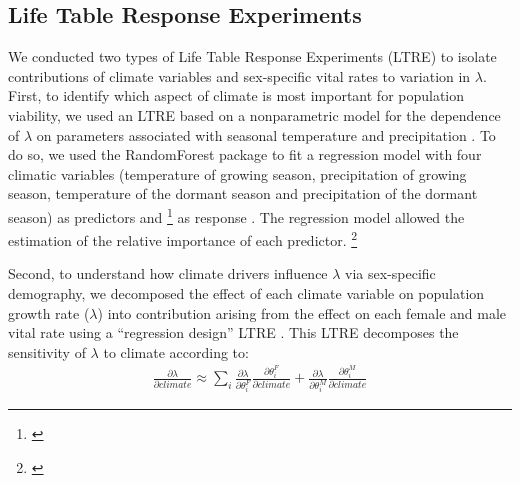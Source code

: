 \documentclass[12pt]{article}\usepackage[]{graphicx}\usepackage[dvipsnames]{xcolor}
\newcommand{\tom}[2]{{\color{red}{#1}}\footnote{\textit{\color{red}{#2}}}}
\newcommand{\jacob}[2]{{\color{blue}{#1}}\footnote{\textit{\color{blue}{#2}}}}
\begin{document}
\subsection*{Life Table Response Experiments}
We conducted two types of Life Table Response Experiments (LTRE) to isolate contributions of climate variables and sex-specific vital rates to variation in $\lambda$.
First, to identify which aspect of climate is most important for population viability, we used an LTRE based on a nonparametric model for the dependence of $\lambda$ on parameters associated with seasonal temperature and precipitation \citep{ellner2016data}. 
To do so, we used the RandomForest package to fit a regression model with four climatic variables (temperature of growing season, precipitation of growing season, temperature of the dormant season and precipitation of the dormant season) as predictors  and \tom{$\lambda$}{Is this lambda from the female-dominant or two-sex model? Does it matter?} as response \citep{liaw2002classification}.
The regression model allowed the estimation of the relative importance of each predictor. 
\tom{The importance is measured by asking: how wrongly is $\lambda$ predicted if we replaced the focal predictor (e.g., temperature of growing season) by a random value of the other predictors.}{I do not understand this.}

Second, to understand how climate drivers influence $\lambda$ via sex-specific demography, we decomposed the effect of each climate variable on population growth rate ($\lambda$) into contribution arising from the effect on each female and male vital rate using a ``regression design'' LTRE \citep{caswell1989analysis,caswell2000matrix}.
This LTRE decomposes the sensitivity of $\lambda$ to climate according to:
\begin{align}\label{eq:ltresex}
\frac{\partial \lambda}{\partial climate} \approx \sum_{i} \frac{\partial \lambda}{\partial \theta^{F}_{i}} \frac{\partial \theta^{F}_{i}}{\partial climate} + \frac{\partial \lambda}{\partial \theta^{M}_{i}} \frac{\partial \theta^{M}_{i}}{\partial climate}
\end{align}
\end{document}
